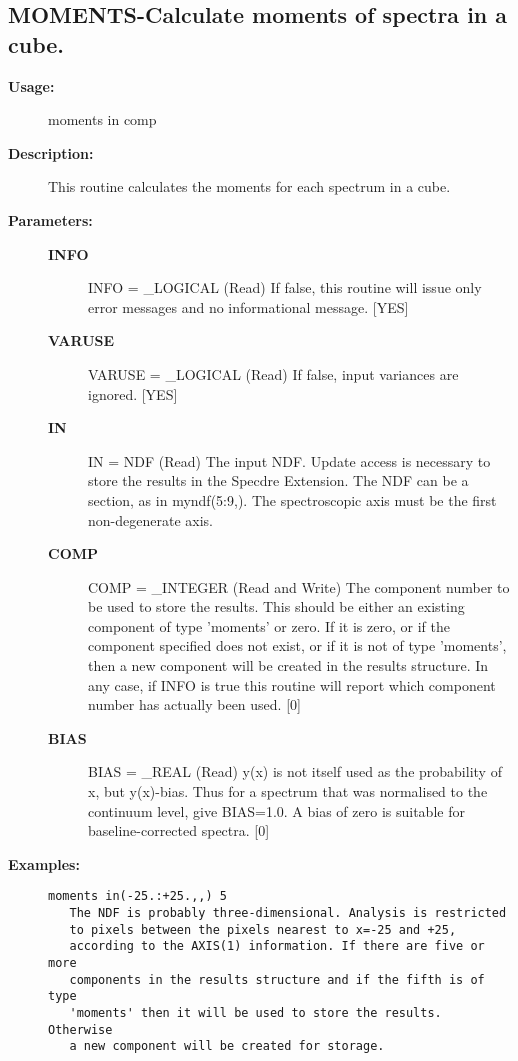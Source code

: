 \subsection{MOMENTS-\label{MOMENTS}Calculate moments of spectra in a cube.}
\begin{description}

\item [{\bf Usage:}]

   moments in comp


\item [{\bf Description:}]

   This routine calculates the moments for each spectrum in a cube.


\item [{\bf Parameters:}]
\begin{description}
\item [{\bf INFO}]
INFO = _LOGICAL (Read)
   If false, this routine will issue only error messages and no
   informational message. [YES]
\item [{\bf VARUSE}]
VARUSE = _LOGICAL (Read)
   If false, input variances are ignored. [YES]
\item [{\bf IN}]
IN = NDF (Read)
   The input NDF. Update access is necessary to store the results
   in the Specdre Extension. The NDF can be a section, as in
   myndf(5:9,). The spectroscopic axis must be the first
   non-degenerate axis.
\item [{\bf COMP}]
COMP = _INTEGER (Read and Write)
   The component number to be used to store the results. This
   should be either an existing component of type 'moments' or
   zero. If it is zero, or if the component specified does not
   exist, or if it is not of type 'moments', then a new component
   will be created in the results structure. In any case, if INFO
   is true this routine will report which component number has
   actually been used. [0]
\item [{\bf BIAS}]
BIAS = _REAL (Read)
   y(x) is not itself used as the probability of x, but y(x)-bias.
   Thus for a spectrum that was normalised to the continuum level,
   give BIAS=1.0. A bias of zero is suitable for baseline-corrected
   spectra. [0]
\end{description}

\item [{\bf Examples:}]
\begin{verbatim}
moments in(-25.:+25.,,) 5
   The NDF is probably three-dimensional. Analysis is restricted
   to pixels between the pixels nearest to x=-25 and +25,
   according to the AXIS(1) information. If there are five or more
   components in the results structure and if the fifth is of type
   'moments' then it will be used to store the results. Otherwise
   a new component will be created for storage.


\end{verbatim}
\end{description}
